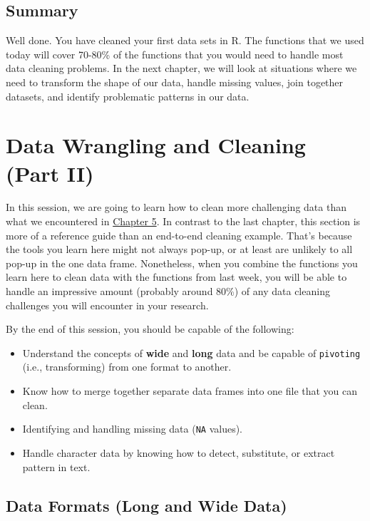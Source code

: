 \documentclass[
]{book}
\begin{document}
\hypertarget{summary-5}{%
\section{Summary}\label{summary-5}}

Well done. You have cleaned your first data sets in R. The functions that we used today will cover 70-80\% of the functions that you would need to handle most data cleaning problems. In the next chapter, we will look at situations where we need to transform the shape of our data, handle missing values, join together datasets, and identify problematic patterns in our data.

\hypertarget{datacleaning2}{%
\chapter{Data Wrangling and Cleaning (Part II)}\label{datacleaning2}}

In this session, we are going to learn how to clean more challenging data than what we encountered in \protect\hyperlink{datacleaning1}{Chapter 5}. In contrast to the last chapter, this section is more of a reference guide than an end-to-end cleaning example. That's because the tools you learn here might not always pop-up, or at least are unlikely to all pop-up in the one data frame. Nonetheless, when you combine the functions you learn here to clean data with the functions from last week, you will be able to handle an impressive amount (probably around 80\%) of any data cleaning challenges you will encounter in your research.

By the end of this session, you should be capable of the following:

\begin{itemize}
\item
  Understand the concepts of \textbf{wide} and \textbf{long} data and be capable of \texttt{pivoting} (i.e., transforming) from one format to another.
\item
  Know how to merge together separate data frames into one file that you can clean.
\item
  Identifying and handling missing data (\texttt{NA} values).
\item
  Handle character data by knowing how to detect, substitute, or extract pattern in text.
\end{itemize}

\hypertarget{data-formats-long-and-wide-data}{%
\section{Data Formats (Long and Wide Data)}\label{data-formats-long-and-wide-data}}
\end{document}
